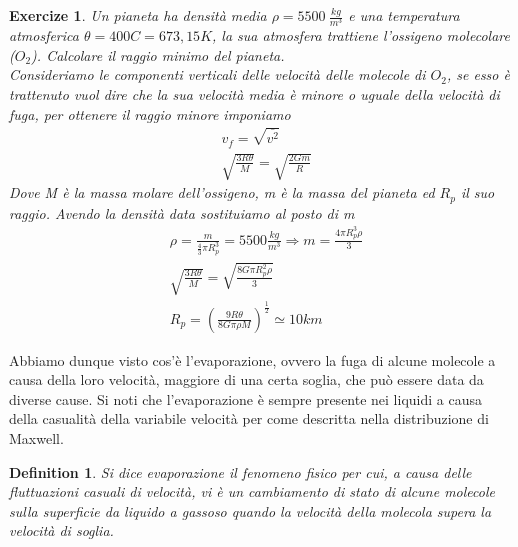 \documentclass[10pt,a4paper]{article}
\newtheorem{exercize}{Exercize}
\newtheorem{definition}{Definition}
\begin{document}
\begin{exercize}
 Un pianeta ha densità media $\rho = 5500\ \frac{kg}{m^3}$ e una temperatura atmosferica $\theta = 400 C = 673,15 K$, la sua atmosfera trattiene l'ossigeno molecolare ($O_2$). Calcolare il raggio minimo del pianeta.\\
 Consideriamo le componenti verticali delle velocità delle molecole di $O_2$, se esso è trattenuto vuol dire che la sua velocità media è minore o uguale della velocità di fuga, per ottenere il raggio minore imponiamo 
 \begin{align*}
	&v_f = \sqrt{\overline{v^2}}\\
	&\sqrt{\frac{3 R \theta}{M}} = \sqrt{\frac{2 G m}{R}}
 \end{align*}
Dove M è la massa molare dell'ossigeno, m è la massa del pianeta ed $R_p$ il suo raggio. Avendo la densità data sostituiamo al posto di m 
\begin{align*}
	&\rho = \frac{m}{\frac{4}{3}\pi R_p^3}=5500 \frac{kg}{m^3} \Rightarrow m = \frac{4 \pi R_p^3 \rho}{3}\\
	&\sqrt{\frac{3 R\theta}{M}} = \sqrt{\frac{8 G \pi R_p^2 \rho}{3}}\\
	& R_p = \left(\frac{9 R \theta}{8G\pi \rho M}\right)^{\frac{1}{2}}\simeq 10 km
\end{align*}
\end{exercize}
Abbiamo dunque visto cos'è l'evaporazione, ovvero la fuga di alcune molecole a causa della loro velocità, maggiore di una certa soglia, che può essere data da diverse cause. Si noti che l'evaporazione è sempre presente nei liquidi a causa della casualità della variabile velocità per come descritta nella distribuzione di Maxwell.
\begin{definition}
Si dice evaporazione il fenomeno fisico per cui, a causa delle fluttuazioni casuali di velocità, vi è un cambiamento di stato di alcune molecole sulla superficie da liquido a gassoso quando la velocità della molecola supera la velocità di soglia. 
\end{definition}
\end{document}
